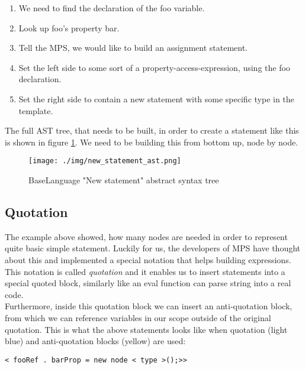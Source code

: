 \begin{enumerate}
	\item We need to find the declaration of the foo variable.
	\item Look up foo's property bar.
	\item Tell the MPS, we would like to build an assignment statement.
	\item Set the left side to some sort of a property-access-expression, using the foo declaration.
	\item Set the right side to contain a new statement with some specific type in the template.
\end{enumerate}

The full AST tree, that needs to be built, in order to create a statement like this is shown in figure \ref{fig:new_ast}.
We need to be building this from bottom up, node by node.

\begin{figure}[h]
	\centering
	\hspace*{-18mm}
	\texttt{[image: ./img/new\_statement\_ast.png]}
	\caption{BaseLanguage "New statement" abstract syntax tree}
	\label{fig:new_ast}
\end{figure}

\subsection{Quotation}
The example above showed, how many nodes are needed in order to represent quite basic simple statement.
Luckily for us, the developers of MPS have thought about this and implemented a special notation that helps building expressions.
This notation is called \textit{quotation} and it enables us to insert statements into a special quoted block, similarly like an eval function can parse string into a real code.
\\

Furthermore, inside this quotation block we can insert an anti-quotation block, from which we can reference variables in our scope outside of the original quotation.
This is what the above statements looks like when quotation (light blue) and anti-quotation blocks (yellow) are used:

\begin{center}
	\texttt{\colorbox{cyan!30}{<}\lexerrule{\%(} fooRef \lexerrule{)\%}.\lexerrule{\%(} barProp \lexerrule{)\%} = new node <\lexerrule{\textasciicircum(} type \lexerrule{)\textasciicircum}>();>\colorbox{cyan!30}{>}}
\end{center}


